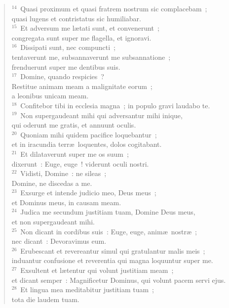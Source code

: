 \begin{flushleft}
\begin{verse}
${}^{14}$~Quasi proximum et quasi fratrem nostrum sic complacebam~;\\ quasi lugens et contristatus sic humiliabar.\\
${}^{15}$~Et adversum me l\ae tati sunt, et convenerunt~;\\ congregata sunt super me flagella, et ignoravi.\\
${}^{16}$~Dissipati sunt, nec compuncti~;\\ tentaverunt me, subsannaverunt me subsannatione~;\\ frenduerunt super me dentibus suis.\\
${}^{17}$~Domine, quando respicies~?\\ Restitue animam meam a malignitate eorum~;\\ a leonibus unicam meam.\\
${}^{18}$~Confitebor tibi in ecclesia magna~; in populo gravi laudabo te.\\
${}^{19}$~Non supergaudeant mihi qui adversantur mihi inique,\\ qui oderunt me gratis, et annuunt oculis.\\
${}^{20}$~Quoniam mihi quidem pacifice loquebantur~;\\ et in iracundia terr\ae\ loquentes, dolos cogitabant.\\
${}^{21}$~Et dilataverunt super me os suum~;\\ dixerunt~: Euge, euge~! viderunt oculi nostri.\\
${}^{22}$~Vidisti, Domine~: ne sileas~;\\ Domine, ne discedas a me.\\
${}^{23}$~Exsurge et intende judicio meo, Deus meus~;\\ et Dominus meus, in causam meam.\\
${}^{24}$~Judica me secundum justitiam tuam, Domine Deus meus,\\ et non supergaudeant mihi.\\
${}^{25}$~Non dicant in cordibus suis~: Euge, euge, anim\ae\ nostr\ae~;\\ nec dicant~: Devoravimus eum.\\
${}^{26}$~Erubescant et revereantur simul qui gratulantur malis meis~;\\ induantur confusione et reverentia qui magna loquuntur super me.\\
${}^{27}$~Exsultent et l\ae tentur qui volunt justitiam meam~;\\ et dicant semper~: Magnificetur Dominus, qui volunt pacem servi ejus.\\
${}^{28}$~Et lingua mea meditabitur justitiam tuam~;\\ tota die laudem tuam.\end{verse}\end{flushleft}


